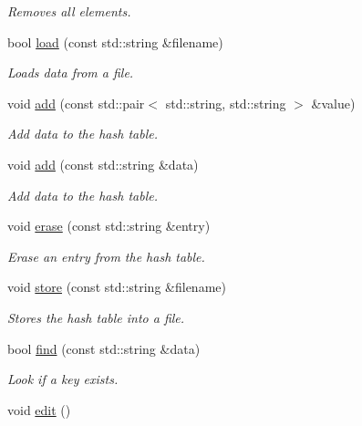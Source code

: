 \begin{DoxyCompactItemize}
\begin{DoxyCompactList}\small\item\em Removes all elements. \end{DoxyCompactList}\item 
bool \hyperlink{classttl_1_1_valman_ae7f92b4e9d4b97180c57c7ea34b040c3}{load} (const std\-::string \&filename)
\begin{DoxyCompactList}\small\item\em Loads data from a file. \end{DoxyCompactList}\item 
void \hyperlink{classttl_1_1_valman_a3683caef3a4f4a0a06097d83ab892599}{add} (const std\-::pair$<$ std\-::string, std\-::string $>$ \&value)
\begin{DoxyCompactList}\small\item\em Add data to the hash table. \end{DoxyCompactList}\item 
void \hyperlink{classttl_1_1_valman_a94f8a3ddd50fd4be44997145e06b4ff1}{add} (const std\-::string \&data)
\begin{DoxyCompactList}\small\item\em Add data to the hash table. \end{DoxyCompactList}\item 
void \hyperlink{classttl_1_1_valman_add2a2e1e51491ab9d596927d0adb4267}{erase} (const std\-::string \&entry)
\begin{DoxyCompactList}\small\item\em Erase an entry from the hash table. \end{DoxyCompactList}\item 
void \hyperlink{classttl_1_1_valman_add510b6dc8d492fd223b51f3db9dbc0c}{store} (const std\-::string \&filename)
\begin{DoxyCompactList}\small\item\em Stores the hash table into a file. \end{DoxyCompactList}\item 
bool \hyperlink{classttl_1_1_valman_a75d3a81d06664d1759b1e7170b259a43}{find} (const std\-::string \&data)
\begin{DoxyCompactList}\small\item\em Look if a key exists. \end{DoxyCompactList}\item 
\hypertarget{classttl_1_1_valman_a4099a57f87bd220a24446f70041231be}{void \hyperlink{classttl_1_1_valman_a4099a57f87bd220a24446f70041231be}{edit} ()}\label{classttl_1_1_valman_a4099a57f87bd220a24446f70041231be}


\end{DoxyCompactItemize}
